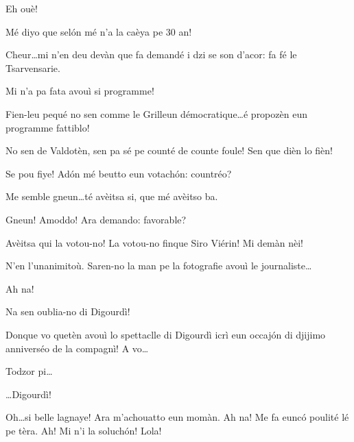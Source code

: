 \begin{drama}
\Ronnyspeaks Eh ouè!

\Laurentspeaks Mé diyo que sel\'on mé n'a la caèya pe 30 an!

\Ronnyspeaks Cheur\ldots mi n'en deu devàn que fa demandé i dzi se son d'acor: fa fé le Tsarvensarie.

\Laurentspeaks Mi n'a pa fata avouì si programme!

\Ronnyspeaks Fien-leu pequé no sen comme le Grilleun démocratique\ldots é propozèn eun programme fattiblo!

\Laurentspeaks No sen de Valdotèn, sen pa sé pe counté de counte foule! Sen que dièn lo fièn!

\Ronnyspeaks Se pou fiye! Ad\'on mé beutto eun votach\'on: countréo?


\Laurentspeaks Me semble gneun\ldots té avèitsa si, que mé avèitso ba.

\Ronnyspeaks Gneun! Amoddo! Ara demando: favorable?


\Laurentspeaks Avèitsa qui la votou-no! La votou-no finque Siro Viérin! Mi demàn nèi!

\Ronnyspeaks N'en l'unanimitoù. Saren-no la man pe la fotografie avouì le journaliste\ldots


\Laurentspeaks Ah na!


\Ronnyspeaks Na sen oublia-no di Digourdì!

\Laurentspeaks Donque vo quetèn avouì lo spettaclle di Digourdì icrì eun occaj\'on di djijimo anniverséo de la compagnì! A vo\ldots

\Ronnyspeaks Todzor pi\ldots

\Tcheuttespeaks \ldots Digourdì!

\act[Acte I]

\ridoiver



\Maganspeaks {} Oh\ldots si belle lagnaye! Ara m'achouatto eun momàn. Ah na! Me fa euncó poulité lé pe tèra. Ah! Mi n'i la soluch\'on! Lola!


\end{drama}
